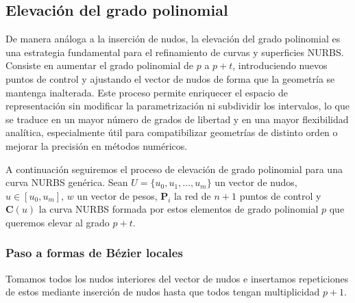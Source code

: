 \documentclass[11pt]{book}
\theoremstyle{plain} %
\theoremstyle{definition} %
\theoremstyle{definition} %
\begin{document}

\subsection{Elevación del grado polinomial}

De manera análoga a la inserción de nudos, la elevación del grado polinomial es una estrategia fundamental para
el refinamiento de curvas y superficies NURBS. Consiste en aumentar el grado polinomial de $p$ a $p+t$,
introduciendo nuevos puntos de control y ajustando el vector de nudos de forma que la geometría se mantenga
inalterada. Este proceso permite enriquecer el espacio de representación sin modificar la parametrización ni
subdividir los intervalos, lo que se traduce en un mayor número de grados de libertad y en una mayor flexibilidad
analítica, especialmente útil para compatibilizar geometrías de distinto orden o mejorar la precisión en métodos
numéricos.

A continuación seguiremos el proceso de elevación de grado polinomial para una curva NURBS genérica.
Sean $U = \{u_0, u_1, \ldots, u_{m}\}$ un vector de nudos, $u \in [u_0, u_{m}]$, $w$ un vector de pesos, $\mathbf{P}_i$ la red de $n+1$ puntos de control y $\mathbf{C}(u)$ la curva NURBS formada por estos elementos de grado polinomial $p$ que queremos elevar al grado $p+t$.

\subsubsection{Paso a formas de Bézier locales}

Tomamos todos los nudos interiores del vector de nudos e insertamos repeticiones de estos mediante inserción de nudos hasta que todos tengan multiplicidad $p+1$.
\end{document}
